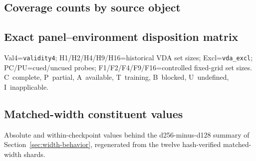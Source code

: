 \documentclass[10pt]{article}
\newcommand{\env}[1]{\texttt{#1}}
\begin{document}
\subsection{Coverage counts by source object}\label{app:coverage}



\subsection{Exact panel--environment disposition matrix}\label{app:disposition}
Val4=\env{validity4}; H1/H2/H4/H9/H16=historical VDA set sizes; Excl=\env{vda\_excl}; PC/PU=cued/uncued probes; F1/F2/F4/F9/F16=controlled fixed-grid set sizes. C~complete, P~partial, A~available, T~training, B~blocked, U~undefined, I~inapplicable.

\restoregeometry

\subsection{Matched-width constituent values}\label{app:matched-width-constituents}
Absolute and within-checkpoint values behind the d256-minus-d128 summary of Section~\ref{sec:width-behavior}, regenerated from the twelve hash-verified matched-width shards.


\end{document}
